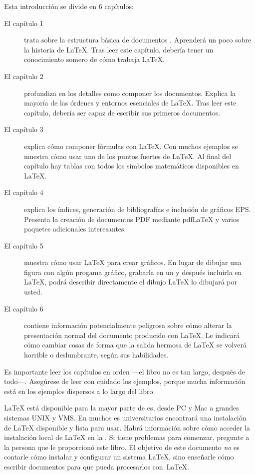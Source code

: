 Esta introducción se divide en 6 capítulos:
\begin{description}
  \item[El capítulo 1] trata sobre la estructura básica de documentos \LaTeXe{}.  Aprenderá un poco sobre la historia de \LaTeX{}. Tras leer este capítulo, debería tener un conocimiento somero de cómo trabaja \LaTeX{}.
  \item[El capítulo 2] profundiza en los detalles como componer los documentos.  Explica la mayoría de las órdenes y entornos esenciales de \LaTeX{}.  Tras leer este capítulo, debería ser capaz de escribir sus primeros documentos.
  \item[El capítulo 3] explica cómo componer fórmulas con \LaTeX.  Con muchos ejemplos se muestra cómo usar uno de los puntos fuertes de \LaTeX{}.  Al final del capítulo hay tablas con todos los símbolos matemáticos disponibles en \LaTeX{}.
  \item[El capítulo 4] explica los índices, generación de bibliografías e inclusión de gráficos EPS.  Presenta la creación de documentos PDF mediante pdf\LaTeX{} y varios paquetes adicionales interesantes.
  \item[El capítulo 5] muestra cómo usar \LaTeX{} para crear gráficos. En lugar de dibujar una figura con algún progama gráfico, grabarla en un \filenomo{} y después incluirla en \LaTeX{}, podrá describir directamente el dibujo \LaTeX{} lo dibujará por usted.
  \item[El capítulo 6] contiene información potencialmente peligrosa sobre cómo alterar la presentación normal del documento producido con \LaTeX{}.  Le indicará cómo cambiar cosas de forma que la salida hermosa de \LaTeX{} se volverá horrible o deslumbrante, según sus habilidades.
\end{description}
%
Es importante leer los capítulos en orden ---el libro no es tan largo, después de todo---.  Asegúrese de leer con cuidado los ejemplos, porque mucha información está en los ejemplos dispersos a lo largo del libro.

%
\LaTeX{} está disponible para la mayor parte de \computernomo{}es, desde PC y Mac a grandes sistemas UNIX y VMS.  En muchos \computernomo{}es universitarios encontrará una instalación de \LaTeX{} disponible y lista para usar.  Habrá información sobre cómo acceder la instalación local de \LaTeX{} en la \guide.  Si tiene problemas para comenzar, pregunte a la persona que le proporcionó este libro.  El objetivo de este documento \emph{no} es contarle cómo instalar y configurar un sistema \LaTeX{}, sino enseñarle cómo escribir documentos para que pueda procesarlos con~\LaTeX{}.

